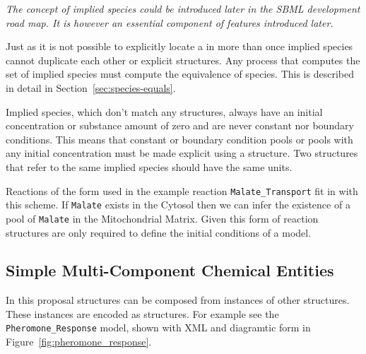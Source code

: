 \documentclass{cekarticle}
\begin{document}
\emph{The concept of implied species could be introduced later in the SBML development road map.
It is however an essential component of features introduced later.}

Just as it is not possible to explicitly locate a  in  more than
once implied species cannot duplicate each other or explicit  structures.
Any process that computes the set of implied species must compute the equivalence of 
species.  This is described in detail in Section~\ref{sec:species-equals}.

Implied species, which don't match any  structures, always have an initial
concentration or substance amount of zero and are never
constant nor boundary conditions.  This means that constant or boundary condition pools or pools
with any initial concentration must be made explicit using a  structure.
Two 
 structures that refer to the same implied species should have
the same units.

Reactions of the form used in the example reaction \texttt{Malate\_Transport} fit in with this scheme.
If \texttt{Malate} exists in the
Cytosol then we can infer the existence of a pool of \texttt{Malate} in the
Mitochondrial Matrix.  Given this form of reaction  structures are only
required to define the initial conditions of a model.

\subsection{Simple Multi-Component Chemical Entities}
\label{sec:multicomponentspecies}

In this proposal  structures can be composed from instances of other
 structures.
These instances are encoded as  structures.
For example see the \texttt{Pheromone\_Response} model, shown with XML and diagramtic form in
Figure~\ref{fig:pheromone_response}.
\end{document}
